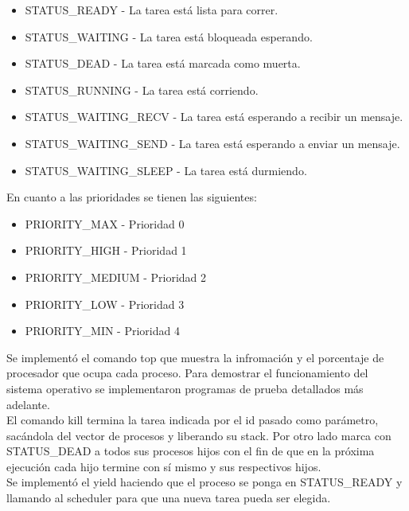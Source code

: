 \documentclass[a4paper,10pt]{article}
\begin{document}
\begin{itemize}
 \item STATUS\_READY - La tarea está lista para correr.
 \item STATUS\_WAITING - La tarea está bloqueada esperando.
 \item STATUS\_DEAD - La tarea está marcada como muerta.
 \item STATUS\_RUNNING - La tarea está corriendo.
 \item STATUS\_WAITING\_RECV - La tarea está esperando a recibir un mensaje.
 \item STATUS\_WAITING\_SEND - La tarea está esperando a enviar un mensaje.
 \item STATUS\_WAITING\_SLEEP - La tarea está durmiendo.
\end{itemize}

En cuanto a las prioridades se tienen las siguientes:

\begin{itemize}
 \item PRIORITY\_MAX - Prioridad 0
 \item PRIORITY\_HIGH - Prioridad 1
 \item PRIORITY\_MEDIUM - Prioridad 2
 \item PRIORITY\_LOW - Prioridad 3
 \item PRIORITY\_MIN - Prioridad 4
\end{itemize}


Se implementó el comando top que muestra la infromación y el porcentaje 
de procesador que ocupa cada proceso. Para demostrar el funcionamiento del 
sistema operativo se implementaron programas de prueba detallados más adelante.\\

El comando kill termina la tarea indicada por el id pasado como parámetro, sacándola del vector de procesos y 
liberando su stack. Por otro lado marca con STATUS\_DEAD a todos sus procesos hijos 
con el fin de que en la próxima ejecución cada hijo termine con sí mismo y sus
respectivos hijos. \\

Se implementó el yield haciendo que el proceso se ponga en STATUS\_READY y llamando 
al scheduler para que una nueva tarea pueda ser elegida.
\end{document}
